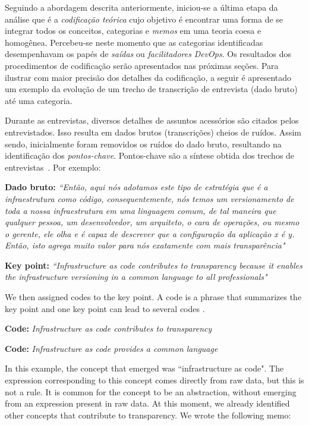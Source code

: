 Seguindo a abordagem descrita anteriormente, iniciou-se a última etapa da
análise que é a \emph{codificação teórica} cujo objetivo é encontrar uma forma
de se integrar todos os conceitos, categorias e {\it memos} em uma teoria coesa
e homogênea. Percebeu-se neste momento que as categorias identificadas
desempenhavam os papés de \emph{saídas} ou \emph{facilitadores} {\it DevOps}.
Os resultados dos procedimentos de codificação serão apresentados nas próximas
seções. Para ilustrar com maior precisão dos detalhes da codificação, a seguir
é apresentado um exemplo da evolução de um trecho de transcrição de entrevista
(dado bruto) até uma categoria.

Durante as entrevistas, diversos detalhes de assuntos acessórios são citados
pelos entrevistados. Isso resulta em dados brutos (transcrições) cheios de
ruídos. Assim sendo, inicialmente foram removidos os ruídos do dado bruto,
resultando na identificação dos \emph{pontos-chave}. Pontos-chave são a síntese
obtida dos trechos de entrevistas~\cite{georgieva2008best}. Por exemplo:

\textbf{Dado bruto:} {\it ``Então, aqui nós adotamos este tipo de estratégia
que é a infraestrutura como código, consequentemente, nós temos um versionamento
de toda a nossa infraestrutura em uma linguagem comum, de tal maneira que
qualquer pessoa, um desenvolvedor, um arquiteto, o cara de operações, ou mesmo
o gerente, ele olha e é capaz de descrever que a configuração da aplicação x é
y. Então, isto agrega muito valor para nós exatamente com mais transparência"}

\textbf{Key point:} \textit{``Infrastructure as code contributes to
transparency because it enables the infrastructure versioning in a common
language to all professionals"}

We then assigned codes to the key point. A code is a phrase that summarizes
the key point and one key point can lead to several codes \cite{hoda2017becoming}.

\textbf{Code:} \textit{Infrastructure as code contributes to transparency}

\textbf{Code:} \textit{Infrastructure as code provides a common language}

In this example, the concept that emerged was ``infrastructure as code". The
expression corresponding to this concept comes directly from raw data, but this
is not a rule. It is common for the concept to be an abstraction, without
emerging from an expression present in raw data.
At this moment, we already identified other concepts that
contribute to transparency. We wrote the following memo:

